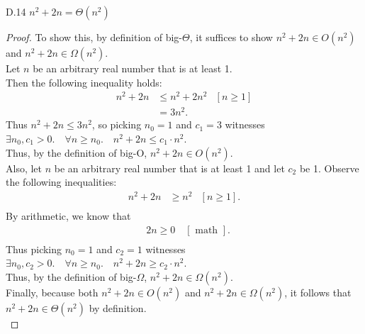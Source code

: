 \documentclass[10pt]{article}
\begin{document}
\begin{enumerate}[label={}]
            D.14 $n^2+2 n=\Theta\left(n^2\right)$
            \begin{proof}
                  To show this, by definition of big-$\Theta$, it suffices to show $n^2+2n \in O\left(n^2\right)$ and $n^2+2n \in \Omega\left(n^2\right)$.\\
                  Let $n$ be an arbitrary real number that is at least 1.\\
                  Then the following inequality holds:
                  $$
                        \begin{aligned}
                              n^2+2 n & \leq n^2+2 n^2
                                      & {\left[n \geq 1\right] } \\
                                      & = 3n^2 .
                        \end{aligned}
                  $$
                  Thus $n^2+2 n \leq 3n^2$, so picking $n_0=1$ and $c_1=3$ witnesses \\$\exists n_0, c_1>0 .\quad \forall n \geq n_0 .\quad n^2+2 n \leq c_1 \cdot n^2$.\\
                        Thus, by the definition of big-O, $n^2+2 n \in O\left(n^2\right)$.\\
                        Also, let $n$ be an arbitrary real number that is at least 1 and let $c_2$ be 1. Observe the following inequalities:
                        $$
                              \begin{aligned}
                                    n^2+2 n & \geq n^2
                                            & {\left[n \geq 1\right] }. \\
                              \end{aligned}
                        $$
                        By arithmetic, we know that
                        $$
                              \begin{aligned}
                                     & 2n \geq 0 \quad [\text { math }]. \\
                              \end{aligned}
                        $$
                        Thus picking $n_0=1$ and $c_2=1$ witnesses \\$\exists n_0, c_2>0 .\quad \forall n \geq n_0 .\quad n^2+2 n \geq c_2 \cdot n^2$.\\
                        Thus, by the definition of big-$\Omega$, $n^2+2 n \in \Omega\left(n^2\right)$.\\
                        Finally, because both $n^2+2 n \in O\left(n^2\right)$ and $n^2+2 n \in \Omega\left(n^2\right)$, it follows that $n^2+2 n\in\Theta(n^2)$ by definition.\\
            \end{proof}


\end{enumerate}
\end{document}
